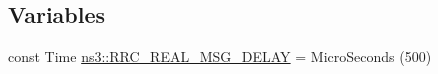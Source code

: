 \subsection*{Variables}
\begin{DoxyCompactItemize}
\item 
const Time \hyperlink{namespacens3_a8e3f859197e39602ba3ea59033f00404}{ns3\+::\+R\+R\+C\+\_\+\+R\+E\+A\+L\+\_\+\+M\+S\+G\+\_\+\+D\+E\+L\+AY} = Micro\+Seconds (500)
\end{DoxyCompactItemize}
